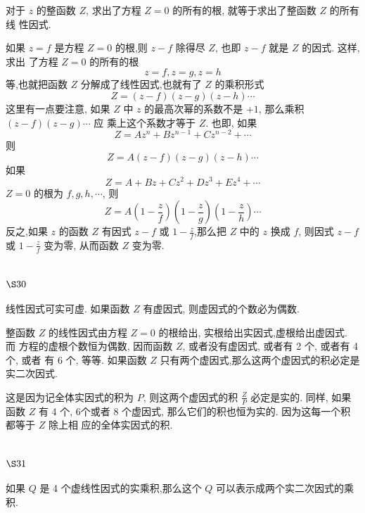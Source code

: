 对于 $z$ 的整函数 $Z$, 求出了方程 $Z=0$ 的所有的根, 就等于求出了整函数 $Z$ 的所有线 性因式.

如果 $z=f$ 是方程 $Z=0$ 的根,则 $z-f$ 除得尽 $Z$, 也即 $z-f$ 就是 $Z$ 的因式. 这样,求出 了方程 $Z=0$ 的所有的根
\[
z=f, z=g, z=h
\]
等,也就把函数 $Z$ 分解成了线性因式,也就有了 $Z$ 的乘积形式
\[
Z=(z-f)(z-g)(z-h) \cdots
\]
这里有一点要注意, 如果 $Z$ 中 $z$ 的最高次幂的系数不是 $+1$, 那么乘积 $(z-f)(z-g) \cdots$ 应 乘上这个系数才等于 $Z$. 也即, 如果
\[
Z=A z^{n}+B z^{n-1}+C z^{n-2}+\cdots
\]
则
\[
Z=A(z-f)(z-g)(z-h) \cdots
\]
如果
\[
Z=A+B z+C z^{2}+D z^{3}+E z^{4}+\cdots
\]
$Z=0$ 的根为 $f, g, h, \cdots$, 则
\[
Z=A\left(1-\frac{z}{f}\right)\left(1-\frac{z}{g}\right)\left(1-\frac{z}{h}\right) \cdots
\]
反之,如果 $z$ 的函数 $Z$ 有因式 $z-f$ 或 $1-\frac{z}{f}$,那么把 $Z$ 中的 $z$ 换成 $f$, 则因式 $z-f$ 或 $1-\frac{z}{f}$ 变为零, 从而函数 $Z$ 变为零.

\section{$\S 30$}

线性因式可实可虚. 如果函数 $Z$ 有虚因式, 则虚因式的个数必为偶数.

整函数 $Z$ 的线性因式由方程 $Z=0$ 的根给出, 实根给出实因式,虚根给出虚因式. 而 方程的虚根个数恒为偶数, 因而函数 $Z$, 或者没有虚因式, 或者有 2 个, 或者有 4 个, 或者 有 6 个, 等等. 如果函数 $Z$ 只有两个虚因式,那么这两个虚因式的积必定是实二次因式. 

这是因为记全体实因式的积为 $P$, 则这两个虚因式的积 $\frac{Z}{P}$ 必定是实的. 同样, 如果函数 $Z$ 有 4 个, 6个或者 8 个虚因式, 那么它们的积也恒为实的. 因为这每一个积都等于 $Z$ 除上相 应的全体实因式的积.

\section{$\S 31$}

如果 $Q$ 是 4 个虚线性因式的实乘积,那么这个 $Q$ 可以表示成两个实二次因式的乘 积.

